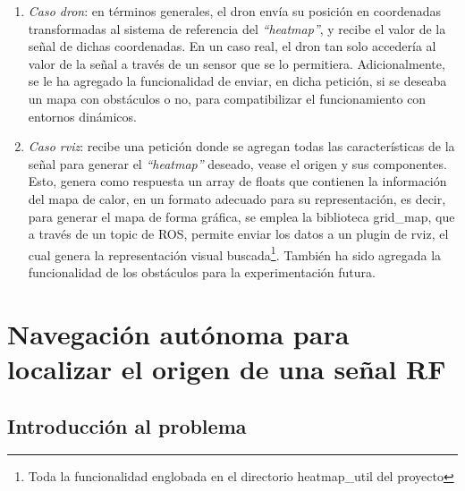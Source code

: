 \begin{enumerate}
	\item \emph{Caso dron}: en términos generales, el dron envía su posición en coordenadas transformadas al sistema de referencia del \emph{``heatmap''}, y recibe el valor de la señal de dichas coordenadas. En un caso real, el dron tan solo accedería al valor de la señal a través de un sensor que se lo permitiera. Adicionalmente, se le ha agregado la funcionalidad de enviar, en dicha petición, si se deseaba un mapa con obstáculos o no, para compatibilizar el funcionamiento con entornos dinámicos.

	\item \emph{Caso rviz}: recibe una petición donde se agregan todas las características de la señal para generar el \emph{``heatmap''} deseado, vease el origen y sus componentes. Esto, genera como respuesta un array de floats que contienen la información del mapa de calor, en un formato adecuado para su representación, es decir, para generar el mapa de forma gráfica, se emplea la biblioteca grid\_map, que a través de un topic de \ac{ROS}, permite enviar los datos a un plugin de rviz, el cual genera la representación visual buscada\footnote[3]{Toda la funcionalidad englobada en el directorio heatmap\_util del proyecto}. También ha sido agregada la funcionalidad de los obstáculos para la experimentación futura.
\end{enumerate}

\section{Navegación autónoma para localizar el origen de una señal \ac{RF}}
\label{sec:signal_follow}

\subsection{Introducción al problema}
\label{subsec:intro_sf}

